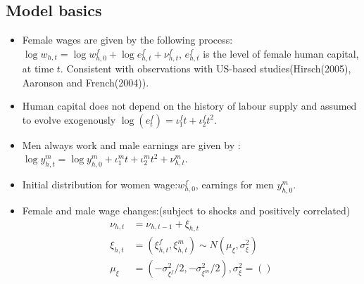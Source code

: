 \subsection{Model basics}
\begin{itemize}
     \item Female wages are given by the following process: $\log w_{h,t} = \log w_{h,0}^f + \log e_{h,t}^f + \nu_{h,t}^f$, $e_{h,t}^f$ is the level of female human capital, at time $t$. Consistent with observations with US-based studies(Hirsch(2005), Aaronson and French(2004)).
     \item Human capital does not depend on the history of labour supply and assumed to evolve exogenously
     $\log(e_t^f) = \iota_{1}^f t + \iota_{2}^f t^2$.
    \item Men always work and male earnings are given by :$\log y_{h,t}^m = \log y_{h,0}^m + \iota_1^m t + \iota_2^m t^2 + \nu_{h,t}^m$.
    \item Initial distribution for women wage:$w_{h,0}^f$,
    earnings for men $y_{h,0}^m$.
    \item Female and male wage changes:(subject to shocks and positively correlated)
    \[ \begin{split}
        \nu_{h,t} & = \nu_{h,t-1} + \xi_{h,t} \\
        \xi_{h,t} & = (\xi_{h,t}^f,\xi_{h,t}^m) \sim N(\mu_{\xi},\sigma_{\xi}^2) \\
        \mu_{\xi} & = (-\sigma_{\xi^f}^2 / 2,-\sigma_{\xi^m}^2 / 2), \sigma_{\xi}^2 = ()
    \end{split} \]
\end{itemize}

